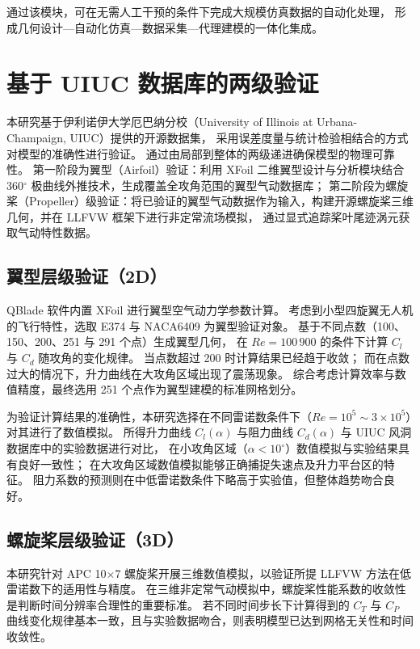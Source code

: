 通过该模块，可在无需人工干预的条件下完成大规模仿真数据的自动化处理，
形成几何设计—自动化仿真—数据采集—代理建模的一体化集成。

\section{基于 UIUC 数据库的两级验证}

本研究基于伊利诺伊大学厄巴纳分校（University of Illinois at Urbana-Champaign, UIUC）提供的开源数据集\cite{Dantsker2022,Abbott1945}，
采用误差度量与统计检验相结合的方式对模型的准确性进行验证。
通过由局部到整体的两级递进确保模型的物理可靠性。
第一阶段为翼型（Airfoil）验证：利用 XFoil 二维翼型设计与分析模块结合 360$^\circ$ 极曲线外推技术，生成覆盖全攻角范围的翼型气动数据库；
第二阶段为螺旋桨（Propeller）级验证：将已验证的翼型气动数据作为输入，构建开源螺旋桨三维几何，并在 LLFVW 框架下进行非定常流场模拟，
通过显式追踪桨叶尾迹涡元获取气动特性数据。

\subsection{翼型层级验证（2D）}

QBlade 软件内置 XFoil 进行翼型空气动力学参数计算。
考虑到小型四旋翼无人机的飞行特性，选取 E374 与 NACA6409 为翼型验证对象。
基于不同点数（100、150、200、251 与 291 个点）生成翼型几何，
在 $Re = 100\,900$ 的条件下计算 $C_l$ 与 $C_d$ 随攻角的变化规律。
当点数超过 200 时计算结果已经趋于收敛；
而在点数过大的情况下，升力曲线在大攻角区域出现了震荡现象。
综合考虑计算效率与数值精度，最终选用 251 个点作为翼型建模的标准网格划分。

为验证计算结果的准确性，本研究选择在不同雷诺数条件下（$Re = 10^5 \sim 3 \times 10^5$）对其进行了数值模拟。
所得升力曲线 $C_l(\alpha)$ 与阻力曲线 $C_d(\alpha)$ 与 UIUC 风洞数据库中的实验数据进行对比，
在小攻角区域（$\alpha < 10^\circ$）数值模拟与实验结果具有良好一致性；
在大攻角区域数值模拟能够正确捕捉失速点及升力平台区的特征。
阻力系数的预测则在中低雷诺数条件下略高于实验值，但整体趋势吻合良好。

\subsection{螺旋桨层级验证（3D）}

本研究针对 APC 10$\times$7 螺旋桨开展三维数值模拟，以验证所提 LLFVW 方法在低雷诺数下的适用性与精度。
在三维非定常气动模拟中，螺旋桨性能系数的收敛性是判断时间分辨率合理性的重要标准。
若不同时间步长下计算得到的 $C_T$ 与 $C_P$ 曲线变化规律基本一致，且与实验数据吻合，则表明模型已达到网格无关性和时间收敛性。

